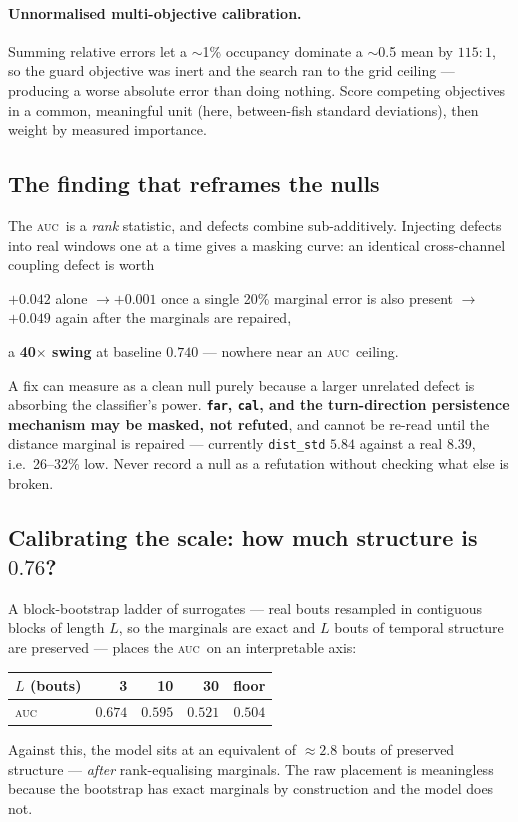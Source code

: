 \documentclass[11pt,a4paper]{article}
\newcommand{\auc}{\textsc{auc}}
\newcommand{\code}[1]{\texttt{\small #1}}
\begin{document}
\paragraph{Unnormalised multi-objective calibration.}
Summing relative errors let a $\sim$1\% occupancy dominate a $\sim$0.5 mean by $115{:}1$,
so the guard objective was inert and the search ran to the grid ceiling --- producing a
worse absolute error than doing nothing. Score competing objectives in a common,
meaningful unit (here, between-fish standard deviations), then weight by measured
importance.

\subsection{The finding that reframes the nulls}\label{sec:masking}

The \auc\ is a \emph{rank} statistic, and defects combine sub-additively. Injecting
defects into real windows one at a time gives a masking curve: an identical cross-channel
coupling defect is worth
\begin{center}
$\mathbf{+0.042}$ alone \quad$\to$\quad $\mathbf{+0.001}$ once a single 20\% marginal error
is also present \quad$\to$\quad $\mathbf{+0.049}$ again after the marginals are repaired,
\end{center}
a \textbf{40$\times$ swing} at baseline $0.740$ --- nowhere near an \auc\ ceiling.

\begin{takeaway}
A fix can measure as a clean null purely because a larger unrelated defect is absorbing
the classifier's power. \textbf{\code{far}, \code{cal}, and the turn-direction persistence
mechanism may be masked, not refuted}, and cannot be re-read until the distance marginal
is repaired --- currently \code{dist\_std} $5.84$ against a real $8.39$, i.e.\ 26--32\%
low. Never record a null as a refutation without checking what else is broken.
\end{takeaway}

\subsection{Calibrating the scale: how much structure is $0.76$?}

A block-bootstrap ladder of surrogates --- real bouts resampled in contiguous blocks of
length $L$, so the marginals are exact and $L$ bouts of temporal structure are preserved
--- places the \auc\ on an interpretable axis:
\begin{center}\small
\begin{tabular}{lrrrr}
\toprule
$L$ (bouts) & 3 & 10 & 30 & floor \\
\midrule
\auc{} & $0.674$ & $0.595$ & $0.521$ & $0.504$ \\
\bottomrule
\end{tabular}
\end{center}
Against this, the model sits at an equivalent of $\approx 2.8$ bouts of preserved
structure --- \emph{after} rank-equalising marginals. The raw placement is meaningless
because the bootstrap has exact marginals by construction and the model does not.
\end{document}
